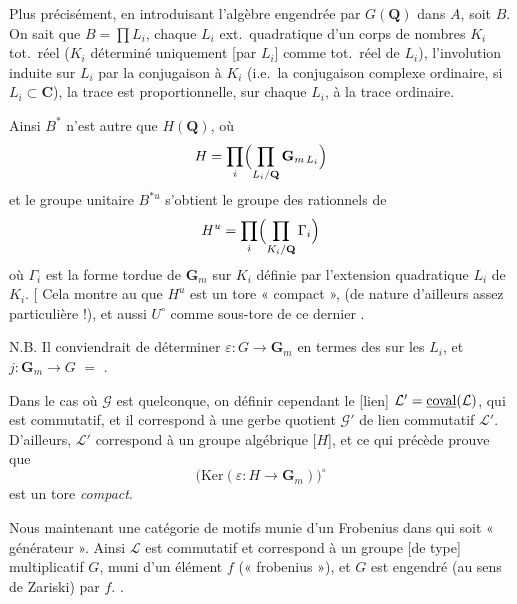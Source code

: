 \documentclass[11pt,a4paper]{article}
\begin{document}
Plus précisément, en introduisant l'algèbre engendrée par 
$G(\mathbf{Q})$ dans $A$, soit $B$. On sait que
$B = \prod L_i$, chaque $L_i$ ext.\ quadratique d'un corps de nombres $K_i$
tot.\ réel ($K_i$ déterminé uniquement  [par
$L_i$] comme \ill{} tot.\ réel de $L_i$), l'involution \ill{} induite sur
$L_i$ par la conjugaison  à $K_i$ (i.e.\ la
conjugaison complexe ordinaire, si $L_i \subset \mathbf{C}$), la trace est
proportionnelle, sur chaque $L_i$, à la trace ordinaire.

Ainsi $B^{*}$ n'est autre que $H(\mathbf{Q})$, où
\[
  H = \prod_{i} \Bigl( \prod_{L_i/\mathbf{Q}} \mathbf{G}_{m\,L_i} \Bigr)
\]
et le groupe unitaire $B^{*u}$ s'obtient  le groupe des
 rationnels de
\[
  H^{u} = \prod_{i} \Bigl( \prod_{K_i/\mathbf{Q}} \Gamma_i \Bigr)
\]
où $\Gamma_i$ est la forme tordue de $\mathbf{G}_m$ sur $K_i$ définie par
l'extension quadratique $L_i$ de $K_i$. [ Cela montre au
\ill{} que $H^{u}$ est un tore « compact », \struck{\ill{}} (de nature
d'ailleurs assez particulière !), et aussi $U^{\circ}$ comme sous-tore de
ce dernier \ill{}.

N.B. Il conviendrait de déterminer $\varepsilon : G \to \mathbf{G}_m$ en
termes des  sur les $L_i$, et
$j : \mathbf{G}_m \to G$ \ill{} $=$ \ill{}.

Dans le cas où $\mathcal{G}$ est quelconque, on \ill{} définir cependant
le [lien] $\mathcal{L}' = \uncertain{\mathrm{coval}}(\mathcal{L})$, qui
est commutatif, et il correspond à une gerbe quotient $\mathcal{G}'$ de
lien commutatif $\mathcal{L}'$. D'ailleurs, $\mathcal{L}'$ correspond à un
groupe algébrique [$H$], et ce qui précède prouve que
\[
  \bigl( \mathrm{Ker}(\varepsilon : H \to \mathbf{G}_m) \bigr)^{\circ}
\]
est un tore \emph{compact}.


Nous  maintenant une  catégorie de
motifs munie d'un \struck{\ill{}} Frobenius  dans
 qui soit « générateur ». Ainsi
$\mathcal{L}$ est commutatif et correspond à un groupe [de type]
\struck{\ill{}} multiplicatif $G$, muni d'un élément $f$ (« frobenius »),
et $G$ est engendré (au sens de Zariski) par $f$.
.
\end{document}
